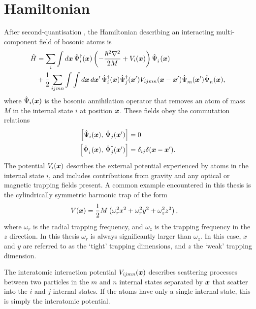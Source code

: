 \section{Hamiltonian}

After second-quantisation \citep{Shankar:1994}, the Hamiltonian describing an interacting multi-component field of bosonic atoms is
\begin{align}
    \label{BackgroundTheory:BasicHamiltonian}
    \begin{split}
        \hat{H} &=
            \sum_i \int d \vect{x}\, \hat{\Psi}_i^\dagger(\vect{x}) \left(- \frac{\hbar^2\nabla^2}{2 M} + V_{i}(\vect{x}) \right) \hat{\Psi}_i^{\phantom{\dagger}}(\vect{x})\\
            &+ \frac{1}{2}\sum_{i j m n} \int \int d\vect{x}\, d\vect{x}'\, \hat{\Psi}_i^\dagger(\vect{x}) \hat{\Psi}_j^\dagger(\vect{x}') V_{ijmn}(\vect{x} - \vect{x}') \hat{\Psi}_m^{\phantom{\dagger}}(\vect{x}') \hat{\Psi}_n^{\phantom{\dagger}}(\vect{x}),
    \end{split}
\end{align}
where $\hat{\Psi}_i(\bm{x})$ is the bosonic annihilation operator that removes an atom of mass $M$ in the internal state $i$ at position $\bm{x}$.  These fields obey the commutation relations
\begin{align}
    \left[\hat{\Psi}_i(\bm{x}),\, \hat{\Psi}_j(\bm{x}') \right] &= 0\\
    \left[ \hat{\Psi}_i^{\phantom{\dagger}}(\bm{x}),\, \hat{\Psi}_j^{\dagger}(\bm{x}')\right] &= \delta_{ij} \delta(\bm{x} - \bm{x}').
\end{align}
The potential $V_i(\bm{x})$ describes the external potential experienced by atoms in the internal state $i$, and includes contributions from gravity and any optical or magnetic trapping fields present.  A common example encountered in this thesis is the cylindrically symmetric harmonic trap of the form
\begin{align}
    V(\bm{x}) &= \frac{1}{2} M \left(\omega_r^2 x^2 + \omega_r^2 y^2 + \omega_z^2 z^2 \right),
\end{align}
where $\omega_r$ is the radial trapping frequency, and $\omega_z$ is the trapping frequency in the $z$ direction.  In this thesis $\omega_r$ is always significantly larger than $\omega_z$.  In this case, $x$ and $y$ are referred to as the `tight' trapping dimensions, and $z$ the `weak' trapping dimension.

The interatomic interaction potential $V_{ijmn}(\bm{x})$ describes scattering processes between two particles in the $m$ and $n$ internal states separated by $\bm{x}$ that scatter into the $i$ and $j$ internal states.  If the atoms have only a single internal state, this is simply the interatomic potential.

